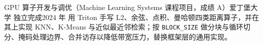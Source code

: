     \resumeSubheading
      {GPU 算子开发与调优（Machine Learning Systems 课程项目，成绩 A）}{爱丁堡大学}
      {独立完成}{2024 年}
      \resumeItemListStart
          {用 Triton 手写 L2、余弦、点积、曼哈顿四类距离算子，并在其上实现 KNN、K-Means 与近似最近邻检索；按 \texttt{BLOCK\_SIZE} 做分块与循环切分、掩码处理边界、合并访存以降低带宽压力，替换框架层的通用实现。}
      \resumeItemListEnd
